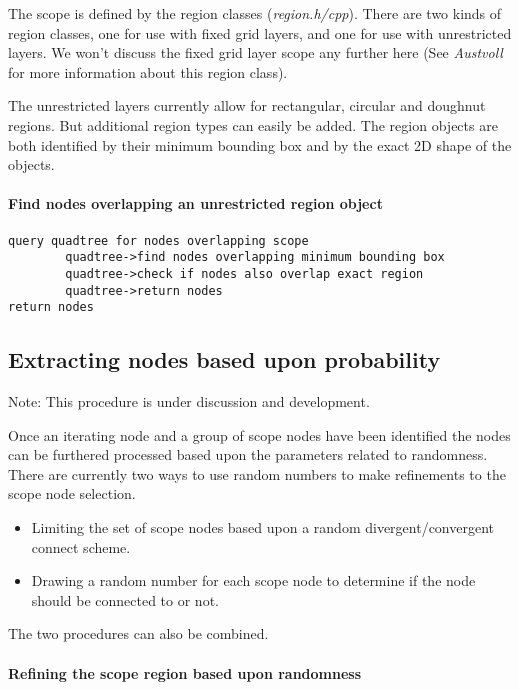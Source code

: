 \documentclass{article}
\begin{document}
The scope is defined by the region classes (\emph{region.h/cpp}). There are two kinds of region classes, one for use with fixed grid layers, and one for use with unrestricted layers. We won't discuss the fixed grid layer scope any further here (See \emph{Austvoll}\cite{austvoll} for more information about this region class).

The unrestricted layers currently allow for rectangular, circular and doughnut regions. But additional region types can easily be added. The region objects are both identified by their minimum bounding box and by the exact 2D shape of the objects.

\paragraph{Find nodes overlapping an unrestricted region object}

\begin{verbatim}
query quadtree for nodes overlapping scope
        quadtree->find nodes overlapping minimum bounding box
        quadtree->check if nodes also overlap exact region
        quadtree->return nodes
return nodes	
\end{verbatim}

\subsection{Extracting nodes based upon probability}

Note: This procedure is under discussion and development.

Once an iterating node and a group of scope nodes have been identified the nodes can be furthered processed based upon the parameters related to randomness. There are currently two ways to use random numbers to make refinements to the scope node selection.

\begin{itemize}
\item Limiting the set of scope nodes based upon a random divergent/convergent connect scheme.
\item Drawing a random number for each scope node to determine if the node should be connected to or not.
\end{itemize}

The two procedures can also be combined.

\paragraph{Refining the scope region based upon randomness}
\end{document}
